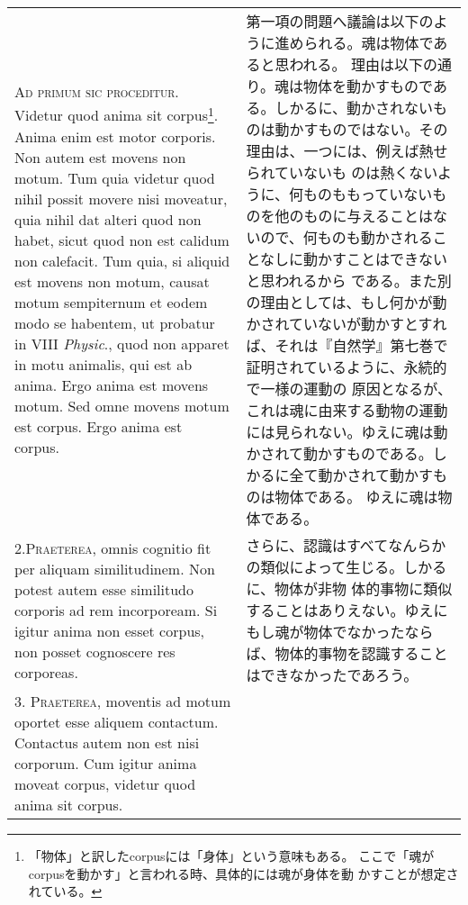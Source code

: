 \documentclass[10pt]{jsarticle} %
\begin{document}
\begin{longtable}{p{21em}p{21em}}



{\scshape Ad primum sic proceditur}. Videtur quod anima sit
 corpus\footnote{「物体」と訳したcorpusには「身体」という意味もある。
ここで「魂がcorpusを動かす」と言われる時、具体的には魂が身体を動
かすことが想定されている。}. Anima enim
est motor corporis. Non autem est movens non motum. Tum quia videtur
quod nihil possit movere nisi moveatur, quia nihil dat alteri quod non
habet, sicut quod non est calidum non calefacit. Tum quia, si aliquid
est movens non motum, causat motum sempiternum et eodem modo se
habentem, ut probatur in VIII {\itshape Physic}., quod non apparet in motu
animalis, qui est ab anima. Ergo anima est movens motum. Sed omne
movens motum est corpus. Ergo anima est corpus.

&

第一項の問題へ議論は以下のように進められる。魂は物体であると思われる。
理由は以下の通り。魂は物体を動かすものである。しかるに、動かされないも
のは動かすものではない。その理由は、一つには、例えば熱せられていないも
のは熱くないように、何ものももっていないものを他のものに与えることはな
いので、何ものも動かされることなしに動かすことはできないと思われるから
である。また別の理由としては、もし何かが動かされていないが動かすとすれ
ば、それは『自然学』第七巻で証明されているように、永続的で一様の運動の
原因となるが、これは魂に由来する動物の運動には見られない。ゆえに魂は動
かされて動かすものである。しかるに全て動かされて動かすものは物体である。
ゆえに魂は物体である。


\\



2.{\scshape Praeterea}, omnis cognitio fit per aliquam
similitudinem. Non potest autem esse similitudo corporis ad rem
incorpoream. Si igitur anima non esset corpus, non posset cognoscere
res corporeas.



&

さらに、認識はすべてなんらかの類似によって生じる。しかるに、物体が非物
体的事物に類似することはありえない。ゆえにもし魂が物体でなかったなら
ば、物体的事物を認識することはできなかったであろう。


\\

3. {\scshape Praeterea}, moventis ad motum oportet esse aliquem
contactum. Contactus autem non est nisi corporum. Cum igitur anima
moveat corpus, videtur quod anima sit corpus.



\end{longtable}
\end{document}
